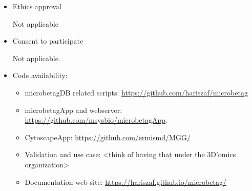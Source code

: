 \documentclass[sn-mathphys,Numbered]{sn-jnl}%
\theoremstyle{thmstyleone}%
\theoremstyle{thmstyletwo}%
\theoremstyle{thmstylethree}%
\begin{document}
\begin{itemize}
        \item Ethics approval 

            Not applicable

        \item Consent to participate
        
            Not applicable.

        \item Code availability: 
        \begin{itemize}
            \item microbetagDB related scripts: \href{https://github.com/hariszaf/microbetag}{https://github.com/hariszaf/microbetag}
            \item microbetagApp and webserver: \href{https://github.com/msysbio/microbetagApp}{https://github.com/msysbio/microbetagApp}.
            \item CytoscapeApp: \href{https://github.com/ermismd/MGG/}{https://github.com/ermismd/MGG/}
            \item Validation and use case: <think of having that under the 3D'omics organization> 
            \item Documentation web-site: \href{https://hariszaf.github.io/microbetag/}{https://hariszaf.github.io/microbetag/}
        \end{itemize}

        

    \end{itemize}
\end{document}
